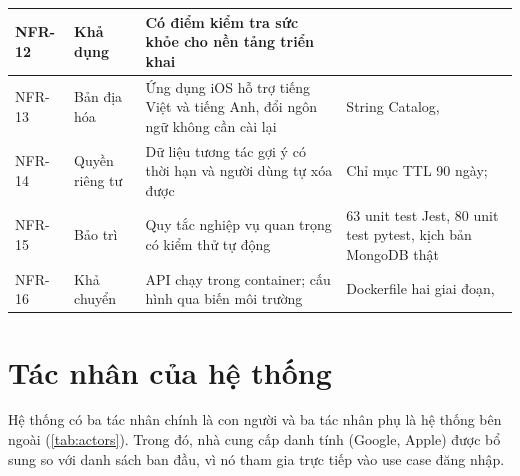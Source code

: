 \begin{rtable}
\begin{longtable}{|C{1.4cm}|L{2.6cm}|L{5.6cm}|L{5.0cm}|}
NFR-12 & Khả dụng & Có điểm kiểm tra sức khỏe cho nền tảng triển khai &  \\ \hline
NFR-13 & Bản địa hóa & Ứng dụng iOS hỗ trợ tiếng Việt và tiếng Anh, đổi ngôn ngữ không cần cài lại & String Catalog,  \\ \hline
NFR-14 & Quyền riêng tư & Dữ liệu tương tác gợi ý có thời hạn và người dùng tự xóa được & Chỉ mục TTL 90 ngày;  \\ \hline
NFR-15 & Bảo trì & Quy tắc nghiệp vụ quan trọng có kiểm thử tự động & 63 unit test Jest, 80 unit test pytest, kịch bản MongoDB thật \\ \hline
NFR-16 & Khả chuyển & API chạy trong container; cấu hình qua biến môi trường & Dockerfile hai giai đoạn,  \\ \hline
\end{longtable}
\end{rtable}

\section{Tác nhân của hệ thống}\label{sec:actors}

Hệ thống có ba tác nhân chính là con người và ba tác nhân phụ là hệ thống bên ngoài (\cref{tab:actors}). Trong đó, nhà cung cấp danh tính (Google, Apple) được bổ sung so với danh sách ban đầu, vì nó tham gia trực tiếp vào use case đăng nhập.

